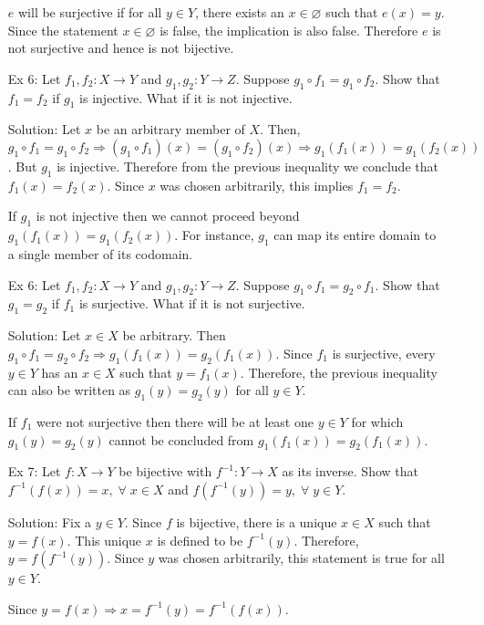 \begin{enumerate}
$e$ will be surjective if for all $y \in Y$, there exists an $x \in 
\varnothing$ such that $e(x) = y$. Since the statement $x \in \varnothing$
is false, the implication is also false. Therefore $e$ is not surjective
and hence is not bijective.

\item[Ex 6:] Let $f_1, f_2: X \rightarrow Y$ and $g_1, g_2: Y \rightarrow
Z$. Suppose $g_1 \circ f_1 = g_1 \circ f_2$. Show that $f_1 = f_2$ if $g_1$
is injective. What if it is not injective.
\item[Solution:] Let $x$ be an arbitrary member of $X$. Then, $g_1 \circ
f_1 = g_1 \circ f_2 \Rightarrow (g_1 \circ f_1)(x) = (g_1 \circ f_2)(x)
\Rightarrow g_1(f_1(x)) = g_1(f_2(x))$. But $g_1$ is injective. Therefore
from the previous inequality we conclude that $f_1(x) = f_2(x)$. Since $x$
was chosen arbitrarily, this implies $f_1 = f_2$.

If $g_1$ is not injective then we cannot proceed beyond $g_1(f_1(x)) = 
g_1(f_2(x))$. For instance, $g_1$ can map its entire domain to a single
member of its codomain.

\item[Ex 6:] Let $f_1, f_2: X \rightarrow Y$ and $g_1, g_2: Y \rightarrow
Z$. Suppose $g_1 \circ f_1 = g_2 \circ f_1$. Show that $g_1 = g_2$ if $f_1$
is surjective. What if it is not surjective.
\item[Solution:] Let $x \in X$ be arbitrary. Then $g_1 \circ f_1 = g_2
\circ f_2 \Rightarrow g_1(f_1(x)) = g_2(f_1(x))$. Since $f_1$ is 
surjective, every $y \in Y$ has an $x \in X$ such that $y = f_1(x)$.
Therefore, the previous inequality can also be written as $g_1(y) = g_2(y)$
for all $y \in Y$.

If $f_1$ were not surjective then there will be at least one $y \in Y$ for
which $g_1(y) = g_2(y)$ cannot be concluded from $g_1(f_1(x)) = 
g_2(f_1(x))$.

\item[Ex 7:] Let $f: X \rightarrow Y$ be bijective with $f^{-1}: Y
\rightarrow X$ as its inverse. Show that $f^{-1}(f(x)) = x, \;\forall\;
x \in X$ and $f(f^{-1}(y)) = y, \;\forall\; y \in Y$.
\item[Solution:] Fix a $y \in Y$. Since $f$ is bijective, there is a unique
$x \in X$ such that $y = f(x)$. This unique $x$ is defined to be 
$f^{-1}(y)$. Therefore, $y = f(f^{-1}(y))$. Since $y$ was chosen 
arbitrarily, this statement is true for all $y \in Y$.

Since $y = f(x) \Rightarrow x = f^{-1}(y) = f^{-1}(f(x))$.


\end{enumerate}

